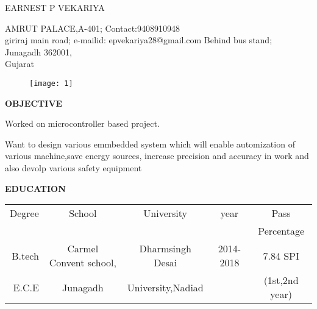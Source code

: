 \documentclass{article}
\begin{document}
 \begin{center}
 	 {
 	 	\large { EARNEST P VEKARIYA}
 	 }
 	
 \end{center}
   \hline

 \begin{flushleft}
 	AMRUT PALACE,A-401; 		\hspace{2.3in}    		    Contact:9408910948             \\
 	giriraj main road; 		\hspace{2.8in}		    	e-mailid: epvekariya28@gmail.com
 	Behind bus stand; \\
 	Junagadh 362001,     \\
 	Gujarat       \\
 \end{flushleft}
 \vspace{-0.3in}


 \begin{figure}[h]
 	\hspace{4.4in}
 	\texttt{[image: 1]}
 \end{figure}
 
  \begin{flushleft}
  	\textbf{OBJECTIVE}
  	
  	\vspace{-0.20in}
  	\hspace{1.5in}
  	Worked on microcontroller based project.\item Want to design various emmbedded system which will enable automization of various machine,save energy sources, increase precision and accuracy in work and also devolp various safety equipment
  \end{flushleft}
  
  \begin{flushleft}
  	\textbf{EDUCATION}
  	\hspace{0.45in}
  	\begin{tabular}{|r|c|c|c|c|}
  		\hline
  		Degree & School & University &  year & Pass   \\
  		&        &            &              & Percentage\\
  		\hline
  		
  		B.tech & Carmel Convent school, & Dharmsingh Desai & 2014-2018 &7.84 SPI\\
  		E.C.E	&Junagadh & University,Nadiad& &(1st,2nd year) \\
  		\hline
  	\end{tabular}
  \end{flushleft}
\end{document}
